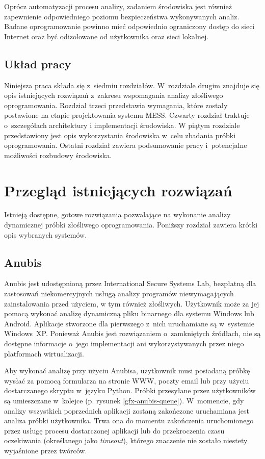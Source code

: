 \documentclass[a4paper,12pt,oneside]{article}
\begin{document}
	Oprócz automatyzacji procesu analizy, zadaniem środowiska jest również zapewnienie odpowiedniego poziomu bezpieczeństwa wykonywanych analiz. Badane oprogramowanie powinno mieć odpowiednio ograniczony dostęp do sieci Internet oraz być odizolowane od użytkownika oraz sieci lokalnej.
			
	\subsection{Układ pracy}
	Niniejsza praca składa się z~siedmiu rozdziałów. W~rozdziale drugim znajduje się opis istniejących rozwiązań z~zakresu wspomagania analizy złośliwego oprogramowania. Rozdział trzeci przedstawia wymagania, które zostały postawione na etapie projektowania systemu MESS. Czwarty rozdział traktuje o~szczegółach architektury i implementacji środowiska. W piątym rozdziale przedstawiony jest opis wykorzystania środowiska w~celu zbadania próbki oprogramowania. Ostatni rozdział zawiera podsumowanie pracy i~potencjalne możliwości rozbudowy środowiska.
			
	\newpage
			
	\section{Przegląd istniejących rozwiązań}
	
	Istnieją dostępne, gotowe rozwiązania pozwalające na wykonanie analizy dynamicznej próbki złośliwego oprogramowania. Poniższy rozdział zawiera krótki opis wybranych systemów.
	
	\subsection{Anubis}
	
	Anubis \cite{www-anubis} jest udostępnioną przez International Secure Systems Lab, bezpłatną dla zastosowań niekomercyjnych usługą analizy programów niewymagających zainstalowania przed użyciem, w tym również złośliwych. Użytkownik może za jej pomocą wykonać analizę dynamiczną pliku binarnego dla systemu Windows lub Android. Aplikacje stworzone dla pierwszego z~nich uruchamiane są w~systemie Windows~XP. Ponieważ Anubis jest rozwiązaniem o~zamkniętych źródłach, nie są dostępne informacje o~jego implementacji ani wykorzystywanych przez niego platformach wirtualizacji.
	
	Aby wykonać analizę przy użyciu Anubisa, użytkownik musi posiadaną próbkę wysłać za pomocą formularza na stronie WWW, poczty email lub przy użyciu dostarczanego skryptu w~języku Python. Próbki przesyłane przez użytkowników są umieszczane w~kolejce (p. rysunek \ref{gfx-anubis-queue}). W~momencie, gdy analizy wszystkich poprzednich aplikacji zostaną zakończone uruchamiana jest analiza próbki użytkownika. Trwa ona do momentu zakończenia uruchomionego przez usługę procesu dostarczonej aplikacji lub do przekroczenia czasu oczekiwania (określanego jako \textit{timeout}), którego znaczenie nie zostało niestety wyjaśnione przez twórców.
	
\end{document}
